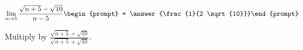 \documentclass{ximera}
\author{Bart Snapp}
\begin{document}
\begin{exercise}

\[
\lim_{n\to 5 } \frac{\sqrt{n+5}-\sqrt{10}}{n-5}\begin{prompt} = \answer{\frac{1}{2 \sqrt{10}}}\end{prompt}
\]
\begin{hint}
Multiply by $\frac{\sqrt{n+5}+\sqrt{10}}{\sqrt{n+5}+\sqrt{10}}$.
\end{hint}
\end{exercise}
\end{document}
